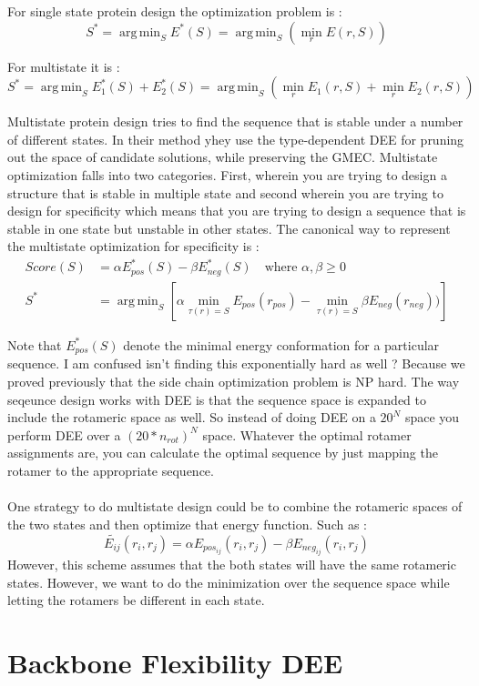 \documentclass[a4]{article}
\DeclareMathOperator*{\argmin}{arg\,min}
\begin{document}
For single state protein design the optimization problem is  : 
\[
S^* = \argmin_S E^*(S) = \argmin_S \left( \min_r E(r,S) \right)
\]

For multistate it is :
\[
S^* = \argmin_S E^*_1(S) + E^*_2(S) = \argmin_S\left( \min_r E_1(r,S) + \min_r E_2(r,S)\right)
\]

Multistate protein design tries to find the sequence that is stable under a number of different states. In their method yhey use the type-dependent DEE for pruning out the space of candidate solutions, while preserving the GMEC. Multistate optimization falls into two categories. First, wherein you are trying to design a structure that is stable in multiple state and second wherein you are trying to design for specificity which means that you are trying to design a sequence that is stable in one state but unstable in other states. The canonical way to represent the multistate optimization for specificity is :
\[
\begin{split}
Score(S) &= \alpha E_{pos}^*(S) - \beta E_{neg}^*(S) \quad \text{where } \alpha,\beta \geq 0 \\
S^* & = \argmin_S \left[\alpha \min_{\tau(r)=S} E_{pos}(r_{pos}) - \min_{\tau(r)=S} \beta E_{neg}(r_{neg})) \right]
\end{split} 
\]

Note that $E_{pos}^*(S)$ denote the minimal energy conformation for a particular sequence. I am confused isn't finding this exponentially hard as well ? Because we proved previously that the side chain optimization problem is NP hard. The way seqeunce design works with DEE is that the sequence space is expanded to include the rotameric space as well. So instead of doing DEE on a $20^N$ space you perform DEE over a $(20*n_{rot})^N$ space. Whatever the optimal rotamer assignments are, you can calculate the optimal sequence by just mapping the rotamer to the appropriate sequence. 
\\
\\
One strategy to do multistate design could be to combine the rotameric spaces of the two states and then optimize that energy function. Such as  : 
\[
\tilde{E_{ij}}(r_i,r_j) = \alpha E_{pos_{ij}}(r_i,r_j) - \beta E_{neg_{ij}}(r_i,r_j)
\]
However, this scheme assumes that the both states will have the same rotameric states. However, we want to do the minimization over the sequence space while letting the rotamers be different in each state. 



\section{Backbone Flexibility DEE}
\end{document}
